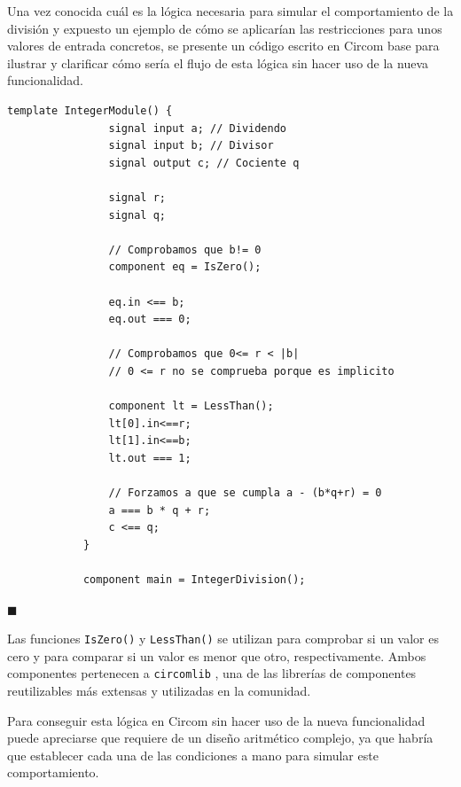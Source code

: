 \documentclass[a4paper,12pt]{report}
\begin{document}
	
	\vspace{0.3cm}
	\noindent Una vez conocida cuál es la lógica necesaria para simular el comportamiento de la división y expuesto un ejemplo de cómo se aplicarían las restricciones para unos valores de entrada concretos, se presente un código escrito en Circom base para ilustrar y clarificar cómo sería el flujo de esta lógica sin hacer uso de la nueva funcionalidad.
	
	
	\vspace{0.3cm}
	\begin{mi_ejemplo}
		\caption{Pseudocódigo división}
		\label{ex:pseudocodigo-div}
		\begin{lstlisting}[language=Circom]
			template IntegerModule() {
				signal input a; // Dividendo
				signal input b; // Divisor
				signal output c; // Cociente q
				
				signal r;
				signal q;
				
				// Comprobamos que b!= 0
				component eq = IsZero();
				
				eq.in <== b;
				eq.out === 0;
				
				// Comprobamos que 0<= r < |b|
				// 0 <= r no se comprueba porque es implicito
				
				component lt = LessThan();
				lt[0].in<==r;
				lt[1].in<==b;
				lt.out === 1;
				
				// Forzamos a que se cumpla a - (b*q+r) = 0
				a === b * q + r;
				c <== q;
			}
			
			component main = IntegerDivision();
		\end{lstlisting}
		
		\hspace*{\fill} $\blacksquare$
	\end{mi_ejemplo}
	
	\noindent Las funciones \texttt{IsZero()} y \texttt{LessThan()} se utilizan para comprobar si un valor es cero y para comparar si un valor es menor que otro, respectivamente. Ambos componentes pertenecen a \texttt{circomlib} \cite{circomlib_comparators}, una de las librerías de componentes reutilizables más extensas y utilizadas en la comunidad.
	
	\vspace{0.3cm}
	\noindent Para conseguir esta lógica en Circom sin hacer uso de la nueva funcionalidad puede apreciarse que requiere de un diseño aritmético complejo, ya que habría que establecer cada una de las condiciones a mano para simular este comportamiento.
	
	\newpage
	
\end{document}
